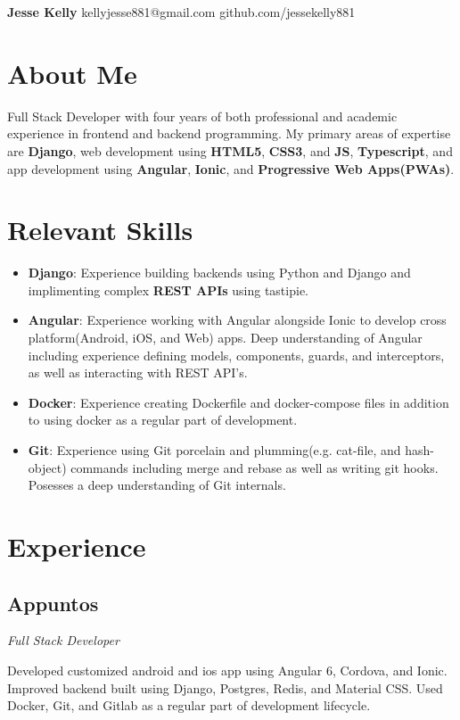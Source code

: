 \documentclass[letterpaper,11pt]{article}
\begin{document}
\begin{flushleft}
\Large{\textbf{Jesse Kelly}}
\newline
kellyjesse881@gmail.com
\newline
github.com/jessekelly881
\end{flushleft}

\section{About Me}
Full Stack Developer with four years of both
professional and academic experience in frontend
and backend programming. My primary areas of
expertise are \textbf{Django}, web development using \textbf{HTML5},
\textbf{CSS3}, and \textbf{JS}, \textbf{Typescript}, and app development using
\textbf{Angular}, \textbf{Ionic}, and \textbf{Progressive Web Apps(PWAs)}.

\section{Relevant Skills}
\begin{itemize}
\item \textbf{Django}: Experience building backends using Python and Django and implimenting complex \textbf{REST APIs} using tastipie.
\item \textbf{Angular}: Experience working with Angular alongside Ionic to develop cross platform(Android, iOS, and Web) apps. Deep understanding of Angular including experience defining models, components, guards, and interceptors, as well as interacting with REST API's.
\item \textbf{Docker}: Experience creating Dockerfile and docker-compose files in addition to using docker as a regular part of development.
\item \textbf{Git}: Experience using Git porcelain and plumming(e.g. cat-file, and hash-object) commands including merge and rebase as well as writing git hooks. Posesses a deep understanding of Git internals.
\end{itemize}

\section{Experience}
\subsection{Appuntos}
\textit{Full Stack Developer}
\vspace{2mm}
\begin{adjustwidth}{1cm}{1cm}
Developed customized android and ios
app using Angular 6, Cordova, and Ionic.
Improved backend built using Django,
Postgres, Redis, and Material CSS. Used
Docker, Git, and Gitlab as a regular part
of development lifecycle.
\end{adjustwidth}
\end{document}
